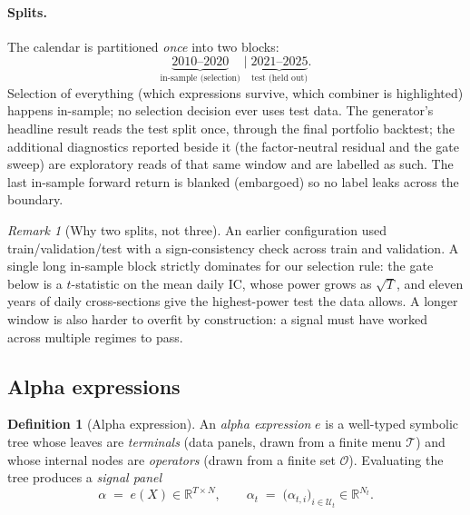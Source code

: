 \documentclass{article}
\theoremstyle{definition}
\newtheorem{definition}{Definition}[section]
\theoremstyle{plain}
\theoremstyle{remark}
\newtheorem{remark}{Remark}[section]
\newcommand{\R}{\mathbb{R}}
\newcommand{\Uni}{\mathcal{U}}
\newcommand{\Term}{\mathcal{T}}
\newcommand{\Op}{\mathcal{O}}
\begin{document}
\paragraph{Splits.} The calendar is partitioned \emph{once} into two blocks:
\[
\underbrace{2010\text{--}2020}_{\text{in-sample (selection)}} \;\big|\;
\underbrace{2021\text{--}2025}_{\text{test (held out)}}.
\]
Selection of everything (which expressions survive, which combiner is highlighted)
happens in-sample; no selection decision ever uses test data. The generator's headline
result reads the test split once, through the final portfolio backtest; the additional
diagnostics reported beside it (the factor-neutral residual and the gate sweep) are
exploratory reads of that same window and are labelled as such. The
last in-sample forward return is blanked (embargoed) so no label leaks across the
boundary.

\begin{remark}[Why two splits, not three]
An earlier configuration used train/validation/test with a sign-consistency check
across train and validation. A single long in-sample block strictly dominates for our
selection rule: the gate below is a $t$-statistic on the mean daily IC, whose power
grows as $\sqrt{T}$, and eleven years of daily cross-sections give the highest-power
test the data allows. A longer window is also harder to overfit by construction:
a signal must have worked across multiple regimes to pass.
\end{remark}

\subsection{Alpha expressions}
\label{sec:alpha-expr}

\begin{definition}[Alpha expression]
An \emph{alpha expression} $e$ is a well-typed symbolic tree whose leaves are
\emph{terminals} (data panels, drawn from a finite menu $\Term$) and whose internal
nodes are \emph{operators} (drawn from a finite set $\Op$). Evaluating the tree
produces a \emph{signal panel}
\[
\alpha \;=\; e(X) \in \R^{T\times N}, \qquad
\alpha_t \;=\; \big(\alpha_{t,i}\big)_{i\in\Uni_t} \in \R^{N_t}.
\]
\end{definition}
\end{document}
